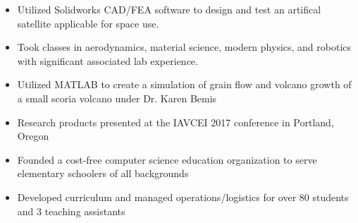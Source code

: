 \documentclass[10pt,a4paper,ragged2e]{altacv}
\begin{document}

\begin{itemize}
\item Utilized Solidworks CAD/FEA software to design and test an artifical satellite applicable for space use.
\item Took classes in aerodynamics, material science, modern physics, and robotics with significant associated lab experience.
\end{itemize}
\divider

\begin{itemize}
\item Utilized MATLAB to create a simulation of grain flow and volcano growth of a small scoria volcano under Dr. Karen Bemis
\item Research products presented at the IAVCEI 2017 conference in \newline Portland, Oregon
\end{itemize}


\begin{itemize}
  \item Founded a cost-free computer science education organization to serve elementary schoolers of all backgrounds
  \item Developed curriculum and managed operations/logistics for over 80 students and 3 teaching assistants
\end{itemize}


\medskip



\clearpage

\end{document}
